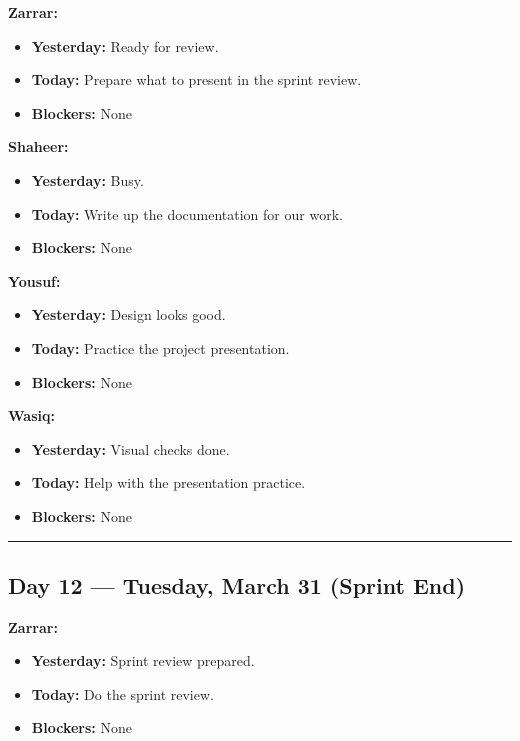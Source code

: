 \documentclass[12pt,a4paper]{article}
\begin{document}
\textbf{Zarrar:}
\begin{itemize}[noitemsep]
    \item \textbf{Yesterday:} Ready for review.
    \item \textbf{Today:} Prepare what to present in the sprint review.
    \item \textbf{Blockers:} None
\end{itemize}

\textbf{Shaheer:}
\begin{itemize}[noitemsep]
    \item \textbf{Yesterday:} Busy.
    \item \textbf{Today:} Write up the documentation for our work.
    \item \textbf{Blockers:} None
\end{itemize}

\textbf{Yousuf:}
\begin{itemize}[noitemsep]
    \item \textbf{Yesterday:} Design looks good.
    \item \textbf{Today:} Practice the project presentation.
    \item \textbf{Blockers:} None
\end{itemize}

\textbf{Wasiq:}
\begin{itemize}[noitemsep]
    \item \textbf{Yesterday:} Visual checks done.
    \item \textbf{Today:} Help with the presentation practice.
    \item \textbf{Blockers:} None
\end{itemize}

\vspace{1em}
\hrule
\vspace{1em}

\subsection*{Day 12 --- Tuesday, March 31 (Sprint End)}

\textbf{Zarrar:}
\begin{itemize}[noitemsep]
    \item \textbf{Yesterday:} Sprint review prepared.
    \item \textbf{Today:} Do the sprint review.
    \item \textbf{Blockers:} None
\end{itemize}
\end{document}

